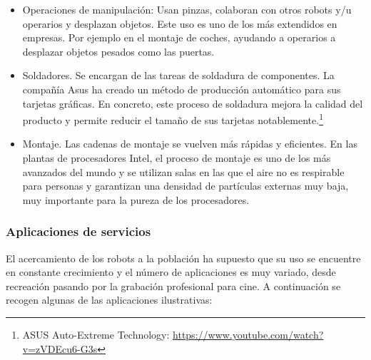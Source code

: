 \begin{itemize}
	\item Operaciones de manipulación: Usan pinzas, colaboran con otros robots y/u operarios y desplazan objetos. Este uso es uno de los más extendidos en empresas. Por ejemplo en el montaje de coches, ayudando a operarios a desplazar objetos pesados como las puertas.
	\item Soldadores. Se encargan de las tareas de soldadura de componentes. La compañía Asus ha creado un método de producción automático para sus tarjetas gráficas. En concreto, este proceso de soldadura mejora la calidad del producto y permite reducir el tamaño de sus tarjetas notablemente.\footnote{ASUS Auto-Extreme Technology: \url{https://www.youtube.com/watch?v=zVDEcu6-G3s}}
	\item Montaje. Las cadenas de montaje se vuelven más rápidas y eficientes. En las plantas de procesadores Intel, el proceso de montaje es uno de los más avanzados del mundo y se utilizan salas en las que el aire no es respirable para personas y garantizan una densidad de partículas externas muy baja, muy importante para la pureza de los procesadores.
\end{itemize}

\subsubsection{Aplicaciones de servicios}

El acercamiento de los robots a la población ha supuesto que su uso se encuentre en constante crecimiento y el número de aplicaciones es muy variado, desde recreación pasando por la grabación profesional para cine. A continuación se recogen algunas de las aplicaciones ilustrativas:

